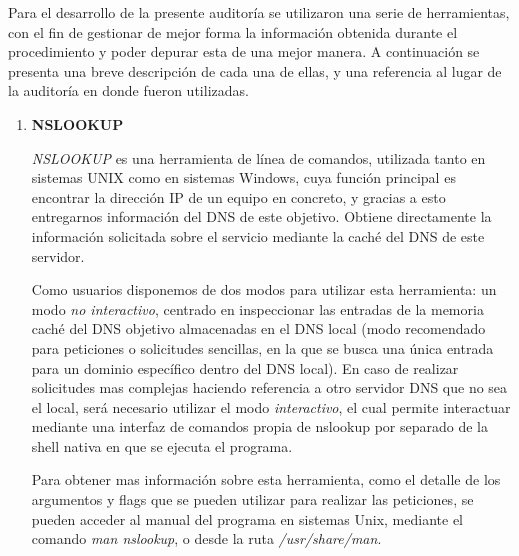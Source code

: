 \documentclass[12pt,oneside,a4paper]{book}
\begin{document}
\vspace{1em}

\hspace{20pt}
Para el desarrollo de la presente auditoría se utilizaron una serie de herramientas, con el fin de gestionar de mejor forma la información obtenida durante el procedimiento y poder depurar esta de una mejor manera. A continuación se presenta una breve descripción de cada una de ellas, y una referencia al lugar de la auditoría en donde fueron  utilizadas.

\vspace{1em}

\begin{enumerate}
    \begin{enumerate}
        
        \item{\textbf{NSLOOKUP}}

        \vspace{1em}

        \hspace{20pt}
        \textit{NSLOOKUP} es una herramienta de línea de comandos, utilizada tanto en sistemas UNIX como en sistemas Windows, cuya función principal es encontrar la dirección IP de un equipo en concreto, y gracias a esto entregarnos información del DNS de este objetivo. Obtiene directamente la información solicitada sobre el servicio mediante la caché del DNS de este servidor. 

        \vspace{1em}

        \hspace{20pt}
        Como usuarios disponemos de dos modos para utilizar esta herramienta: un modo \textit{no interactivo}, centrado en inspeccionar las entradas de la memoria caché del DNS objetivo almacenadas en el DNS local (modo recomendado para peticiones o solicitudes sencillas, en la que se busca una única entrada para un dominio específico dentro del DNS local). En caso de realizar solicitudes mas complejas haciendo referencia a otro servidor DNS que no sea el local, será necesario utilizar el modo \textit{interactivo}, el cual permite interactuar mediante una interfaz de comandos propia de nslookup por separado de la shell nativa en que se ejecuta el programa.

        \vspace{1em}

        \hspace{20pt}
        Para obtener mas información sobre esta herramienta, como el detalle de los argumentos y flags que se pueden utilizar para realizar las peticiones, se pueden acceder al manual del programa en sistemas Unix, mediante el comando \textit{man nslookup}, o desde la ruta \textit{/usr/share/man}.


\end{enumerate}
\end{enumerate}
\end{document}
